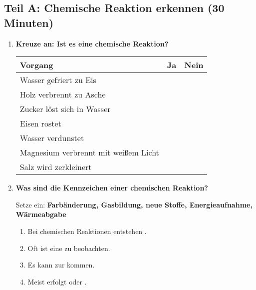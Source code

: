 \subsection*{Teil A: Chemische Reaktion erkennen (30 Minuten)}

\begin{enumerate}[label=\arabic*.]
    \item \textbf{Kreuze an: Ist es eine chemische Reaktion?}
    \vspace{0.5cm}

    \begin{tabular}{|p{7cm}|p{2cm}|p{2cm}|}
        \hline
        \textbf{Vorgang} & \textbf{Ja} & \textbf{Nein} \\
        \hline
        Wasser gefriert zu Eis & & \\
        \hline
        Holz verbrennt zu Asche & & \\
        \hline
        Zucker löst sich in Wasser & & \\
        \hline
        Eisen rostet & & \\
        \hline
        Wasser verdunstet & & \\
        \hline
        Magnesium verbrennt mit weißem Licht & & \\
        \hline
        Salz wird zerkleinert & & \\
        \hline
    \end{tabular}

    \vspace{1cm}

    \item \textbf{Was sind die Kennzeichen einer chemischen Reaktion?}
    \vspace{0.5cm}

    Setze ein: \textbf{Farbänderung, Gasbildung, neue Stoffe, Energieaufnahme, Wärmeabgabe}

    \begin{enumerate}[label=\alph*)]
        \item Bei chemischen Reaktionen entstehen \underline{\hspace{4cm}}.
        \item Oft ist eine \underline{\hspace{4cm}} zu beobachten.
        \item Es kann zur \underline{\hspace{4cm}} kommen.
        \item Meist erfolgt \underline{\hspace{4cm}} oder \underline{\hspace{4cm}}.
    \end{enumerate}


\end{enumerate}
